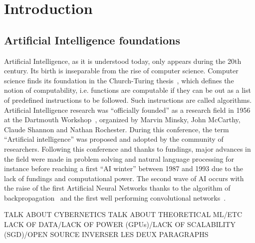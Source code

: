 \chapter{Introduction}
\minitoc
\section{Artificial Intelligence foundations}

Artificial Intelligence, as it is understood today, only appears during the 20th century. Its birth is inseparable from the rise of computer science. Computer science finds its foundation in the Church-Turing thesis~\citep{turing1950computing}, which defines the notion of computability, i.e. functions are computable if they can be out as a list of predefined instructions to be followed. Such instructions are called algorithms. Artificial Intelligence research was  ``officially founded'' as a research field in 1956 at the Dartmouth Workshop~\citep{mccarthy2006proposal}, organized by Marvin Minsky, John McCarthy, Claude Shannon and Nathan Rochester. During this conference, the term ``Artificial intelligence'' was proposed and adopted by the community of researchers. Following this conference and thanks to fundings, major advances in the field were made in problem solving and natural language processing for instance before reaching a first ``AI winter'' between 1987 and 1993 due to the lack of fundings and computational power. The second wave of AI occurs with the raise of the first Artificial Neural Networks thanks to the algorithm of backpropagation~\citep{rumelhart1985learning} and the first well performing convolutional networks~\citep{lecun1995convolutional}. 

TALK ABOUT CYBERNETICS
TALK ABOUT THEORETICAL ML/ETC
LACK OF DATA/LACK OF POWER (GPUs)/LACK OF SCALABILITY (SGD)/OPEN SOURCE 
INVERSER LES DEUX PARAGRAPHS

